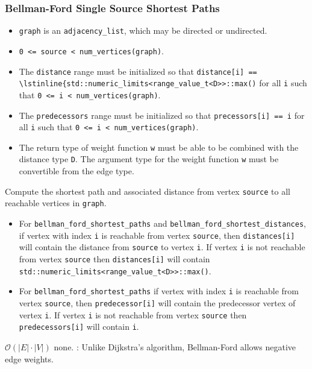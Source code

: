 \subsubsection{Bellman-Ford Single Source Shortest Paths}

{\small

}

\begin{itemdescr}
\pnum\preconditions
\begin{itemize}
\item
\lstinline{graph} is an \lstinline{adjacency_list}, which may be directed or
undirected.
\item
\lstinline{0 <= source < num_vertices(graph)}.
\item
  The \lstinline{distance} range must be initialized so that 
  \lstinline{distance[i] ==  \lstinline{std::numeric_limits<range_value_t<D>>::max()} 
  for all \lstinline{i}
  such that \lstinline{0 <= i < num_vertices(graph)}.  
  \item
  The \lstinline{predecessors} range must be initialized so that
  \lstinline{precessors[i] == i} for all \lstinline{i} such that 
  \lstinline{0 <= i < num_vertices(graph)}.
\item
The return type of weight function \lstinline{w} must be able to
  be combined with the distance type \lstinline{D}.  The argument type for the weight
  function \lstinline{w} must be convertible from the edge type.
\end{itemize}
\pnum
\effects Compute the shortest path and associated distance from vertex
\lstinline{source} to all reachable vertices in \lstinline{graph}.
\pnum\returns
\begin{itemize}
\item For \lstinline{bellman_ford_shortest_paths} and \lstinline{bellman_ford_shortest_distances},
  if vertex with index \lstinline{i} is reachable from vertex \lstinline{source}, then
  \lstinline{distances[i]} will contain the distance from \lstinline{source} to vertex
  \lstinline{i}.  If vertex \lstinline{i} is not reachable from vertex
  \lstinline{source} then \lstinline{distances[i]} will contain
  \lstinline{std::numeric_limits<range_value_t<D>>::max()}.
\item
For \lstinline{bellman_ford_shortest_paths} if vertex with index \lstinline{i} is reachable
from vertex \lstinline{source}, then \lstinline{predecessor[i]} will contain the
predecessor vertex of vertex \lstinline{i}.  If vertex \lstinline{i} is not reachable
from vertex \lstinline{source} then \lstinline{predecessors[i]} will contain
\lstinline{i}.
\end{itemize}
%
\pnum\complexity $\mathcal{O}(|E| \cdot |V|)$ 
\pnum\throws none. 
\pnum\remarks:  Unlike Dijkstra's algorithm, Bellman-Ford allows negative edge weights.
\end{itemdescr}


